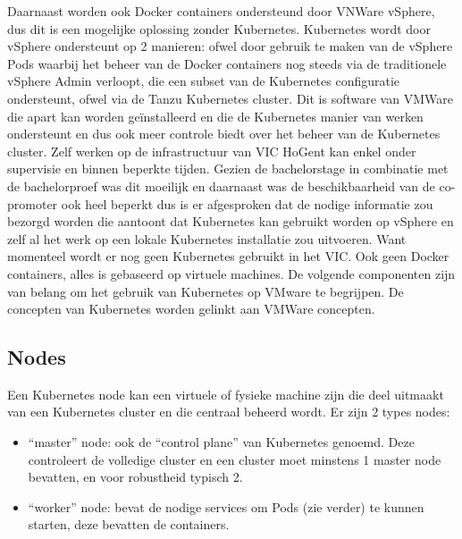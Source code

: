 Daarnaast worden ook Docker containers ondersteund door VNWare vSphere, dus dit is een mogelijke oplossing zonder Kubernetes.
\newline
\newline
Kubernetes wordt door vSphere ondersteunt op 2 manieren: ofwel door gebruik te maken van de vSphere Pods waarbij het beheer van de Docker containers nog steeds via de traditionele vSphere Admin verloopt, die een subset van de Kubernetes configuratie ondersteunt, ofwel via de Tanzu Kubernetes cluster. Dit is software van VMWare die apart kan worden geïnstalleerd en die de Kubernetes manier van werken ondersteunt en dus ook meer controle biedt over het beheer van de Kubernetes cluster.
\newline
\newline
Zelf werken op de infrastructuur van VIC HoGent kan enkel onder supervisie en binnen beperkte tijden. Gezien de bachelorstage in combinatie met de bachelorproef was dit moeilijk en daarnaast was de beschikbaarheid van de co-promoter ook heel beperkt dus is er afgesproken dat de nodige informatie zou bezorgd worden die aantoont dat Kubernetes kan gebruikt worden op vSphere en zelf al het werk op een lokale Kubernetes installatie zou uitvoeren. Want momenteel wordt er nog geen Kubernetes gebruikt in het VIC. Ook geen Docker containers, alles is gebaseerd op virtuele machines. 
\newline
\newline
De volgende componenten zijn van belang om het gebruik van Kubernetes op VMware te begrijpen. De concepten van Kubernetes worden gelinkt aan VMWare concepten.
\newline
\newline
\subsection{Nodes}
Een Kubernetes node kan een virtuele of fysieke machine zijn die deel uitmaakt van een Kubernetes cluster en die centraal beheerd wordt.
Er zijn 2 types nodes:
\begin{itemize}
    \item ``master'' node: ook de ``control plane'' van Kubernetes genoemd. Deze controleert de volledige cluster en een cluster moet minstens 1 master node bevatten, en voor robustheid typisch 2.
    \item ``worker'' node: bevat de nodige services om Pods (zie verder) te kunnen starten, deze bevatten de containers.
\end{itemize}
\autocite{NirShtein2023}
